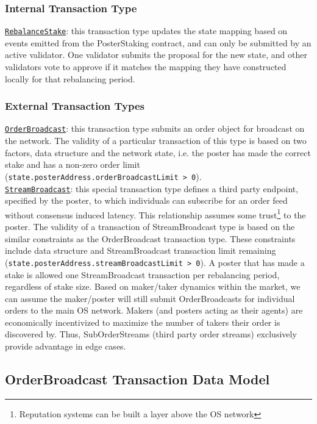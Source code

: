 \documentclass[9pt]{article}
\begin{document}
\subsubsection{Internal Transaction Type}

\noindent \underline{\texttt{RebalanceStake}}: this transaction type updates the state mapping based on events emitted from the PosterStaking contract, and can only be submitted by an active validator. One validator submits the proposal for the new state, and other validators vote to approve if it matches the mapping they have constructed locally for that rebalancing period.

\subsubsection{External Transaction Types}

\noindent \underline{\texttt{OrderBroadcast}}: this transaction type submits an order object for broadcast on the network. The validity of a particular transaction of this type is based on two factors, data structure and the network state, i.e. the poster has made the correct stake and has a non-zero order limit (\texttt{state.posterAddress.orderBroad\-castLimit > 0}). \\

\noindent \underline{\texttt{StreamBroadcast}}: this special transaction type defines a third party endpoint, specified by the poster, to which individuals can subscribe for an order feed without consensus induced latency. This relationship assumes some trust\footnote{Reputation systems can be built a layer above the OS network} to the poster. The validity of a transaction of StreamBroadcast type is based on the similar constraints as the OrderBroadcast transaction type. These constraints include data structure and StreamBroadcast transaction limit remaining (\texttt{state.posterAddress.streamBroadcastLimit > 0}). A poster that has made a stake is allowed one StreamBroadcast transaction per rebalancing period, regardless of stake size. Based on maker/taker dynamics within the market, we can assume the maker/poster will still submit OrderBroadcasts for individual orders to the main OS network. Makers (and posters acting as their agents) are economically incentivized to maximize the number of takers their order is discovered by. Thus, SubOrderStreams (third party order streams) exclusively provide advantage in edge cases.

\subsection{OrderBroadcast Transaction Data Model}\label{data model}
\end{document}
